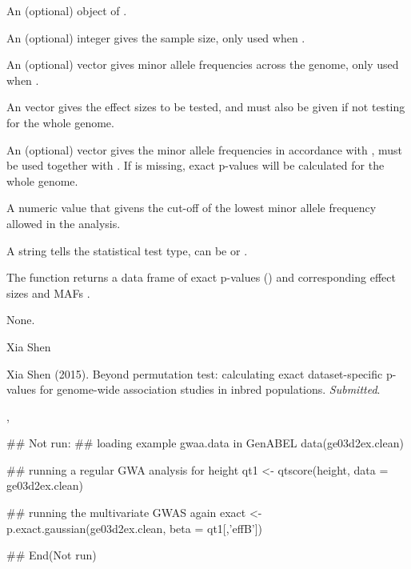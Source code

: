\documentclass[a4paper]{book}
\begin{document}
%
\begin{Arguments}
\begin{ldescription}
\item[\code{gwaa.object}] An (optional) object of .

\item[\code{n}] An (optional) integer gives the sample size, only used when .

\item[\code{maf}] An (optional) vector gives minor allele frequencies across the genome,
only used when .

\item[\code{beta}] An vector gives the effect sizes to be tested, and  must
also be given if not testing for the whole genome.

\item[\code{beta.maf}] An (optional) vector gives the minor allele frequencies in accordance with
, must be used together with . If 
is missing, exact p-values will be calculated for the whole genome.

\item[\code{low.maf}] A numeric value that givens the cut-off of the lowest minor allele frequency
allowed in the analysis.

\item[\code{type}] A string tells the statistical test type, can be  or .
\end{ldescription}
\end{Arguments}
%
\begin{Value}
The function returns a data frame of exact p-values () and corresponding effect
sizes  and MAFs .
\end{Value}
%
\begin{Note}\relax
None.
\end{Note}
%
\begin{Author}\relax
Xia Shen
\end{Author}
%
\begin{References}\relax
Xia Shen (2015). Beyond permutation test: calculating exact dataset-specific p-values
for genome-wide association studies in inbred populations. \emph{Submitted}.
\end{References}
%
\begin{SeeAlso}\relax
{}, 
\end{SeeAlso}
%
\begin{Examples}
\begin{ExampleCode}
## Not run: 
## loading example gwaa.data in GenABEL
data(ge03d2ex.clean)

## running a regular GWA analysis for height
qt1 <- qtscore(height, data = ge03d2ex.clean)

## running the multivariate GWAS again
exact <- p.exact.gaussian(ge03d2ex.clean, beta = qt1[,'effB'])

## End(Not run)
\end{ExampleCode}
\end{Examples}
\printindex{}
\end{document}
